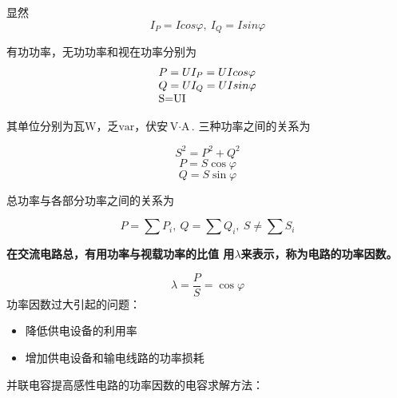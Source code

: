 显然
\[
    I_P=Icos\varphi,~ I_Q=Isin\varphi
\]

有功功率，无功功率和视在功率分别为
\[
\begin{array}{l}
    P=UI_P=UIcos\varphi\\
    Q=UI_Q=UIsin\varphi\\
    $S=UI$
\end{array}
\]

其单位分别为瓦$\text{W}$，乏$\text{var}$，伏安$\text{V}\cdot \text{A}$.
三种功率之间的关系为

\[
    S^2=P^2+Q^2
\]
\[
    P=S\cos\varphi 
\]
\[
    Q=S\sin\varphi 
\]

总功率与各部分功率之间的关系为

\[
    P=\sum P_i,~ Q=\sum Q_i,~ S \ne \sum S_i
\]

\textbf{在交流电路总，有用功率与视载功率的比值
用$\lambda$来表示，称为电路的功率因数。}

\[
    \lambda = \frac{P}{S} = \cos \varphi
\]
功率因数过大引起的问题：
\begin{itemize}
    \item 降低供电设备的利用率
    \item 增加供电设备和输电线路的功率损耗
\end{itemize}
并联电容提高感性电路的功率因数的电容求解方法：

